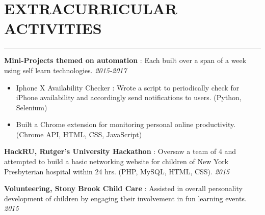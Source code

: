 \documentclass[12pt]{article}
\newcommand{\sectionHeading}[1]{
\vspace{-15pt}
\section*{\small{#1}}
\vspace{-10pt}
\hrule
\vspace{8pt}
}
\newcommand {\projectSectionSubheading}[4]{
    \noindent \small{\textbf{#1} \textit{(#2)} : #3  \hfill \textit{#4}} \\
    \vspace{-10pt}
}
\newcommand {\extracurricularSectionSubheading}[3]{
    \noindent \small{\textbf{#1} : #2 \hfill \textit{#3}} \\
    \vspace{-10pt}
}
\newcommand{\sectionListStart}{
    \begin{itemize}[label={\small{\textbullet}}, leftmargin=20pt] %
}
\newcommand{\sectionListEnd}{\end{itemize} \vspace{0pt}}
\newcommand{\sectionListItem}[1]{\item \small{#1}}
\begin{document}


\sectionHeading{EXTRACURRICULAR ACTIVITIES}
\extracurricularSectionSubheading{Mini-Projects themed on automation}{Each built over a span of a week using self learn technologies.\vspace{-10pt}}{2015-2017}
\sectionListStart
    \sectionListItem
        Iphone X Availability Checker : Wrote a script to periodically check for iPhone availability and accordingly send notifications to users. (Python, Selenium)
    \sectionListItem
        Built a Chrome extension for monitoring personal online productivity. (Chrome API, HTML, CSS, JavaScript)
\sectionListEnd
\vspace{-5pt}

\extracurricularSectionSubheading{HackRU, Rutger's University Hackathon}{Oversaw a team of 4 and attempted to build a basic networking website for children of New York Presbyterian hospital within 24 hrs. (PHP, MySQL, HTML, CSS).}{2015}

\extracurricularSectionSubheading{Volunteering, Stony Brook Child Care}{Assisted in overall personality development of children by engaging their involvement in fun learning events.}{2015}



\end{document}
